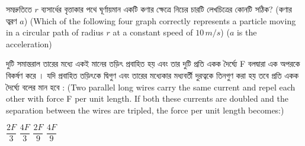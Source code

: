 \documentclass[addpoints]{exam}
\begin{document}
\begin{questions}
\question সমদ্রুতিতে $ r $ ব্যসার্ধের বৃত্তাকার পথে ঘূর্ণায়মান একটি কণার ক্ষেত্রে নিচের চারটি লেখচিত্রের কোনটি সঠিক? (কণার ত্বরণ $ a $) (Which of the following four graph correctly represents a particle moving in a circular path of radius $ r $ at a constant speed of $ 10\,m/s $) ($ a $ is the acceleration)

\begin{oneparchoices}
 \choice{}
 \choice {}
\choice{}
 \choice {}
\end{oneparchoices}


\question   দুটি সমান্তরাল তারের মধ্যে একই মানের তড়িৎ প্রবাহিত হয় এবং তার দুটি প্রতি একক দৈর্ঘ্যে F বলদ্বারা এক অপরকে বিকর্ষণ করে । যদি প্রবাহিত তড়িৎকে দ্বিগুণ এবং তারের মধ্যেকার মধ্যবর্তী দুরত্বকে তিনগুণ করা হয় তবে প্রতি একক দৈর্ঘ্যে বলের মান হবে : (Two parallel long wires carry the same current and repel each other with force F per unit length. If both these currents are doubled and the separation between the wires are tripled, the force per unit length becomes:)

\begin{oneparchoices}
\choice $ \dfrac{2F}{3} $
\choice $ \dfrac{4F}{3} $
\choice $ \dfrac{2F}{9} $
\choice $ \dfrac{4F}{9} $


\end{oneparchoices}
\end{questions}
\end{document}
